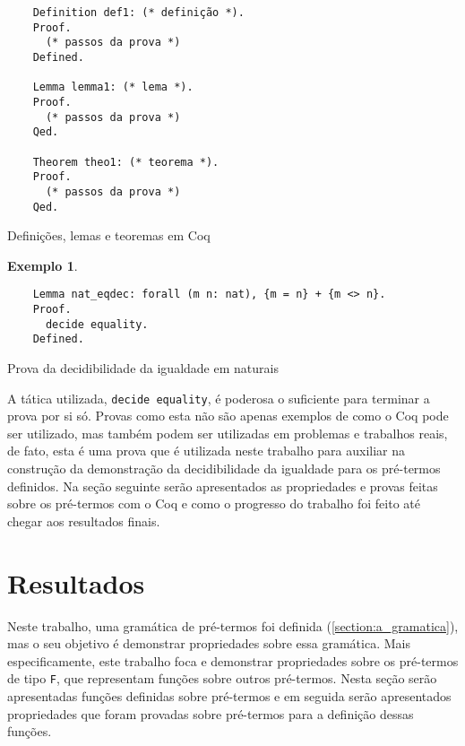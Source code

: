 \documentclass{article}
\newenvironment{codigo}{\captionsetup{type=listing}}{}
\newtheorem{exemplo}{Exemplo}
\begin{document}
\begin{codigo}
\begin{verbatim}
	Definition def1: (* definição *).
	Proof.
	  (* passos da prova *)
	Defined.

	Lemma lemma1: (* lema *).
	Proof.
	  (* passos da prova *)
	Qed.

	Theorem theo1: (* teorema *).
	Proof.
	  (* passos da prova *)
	Qed.
\end{verbatim}
\caption{Definições, lemas e teoremas em Coq}
\label{codigo:provas}
\end{codigo}

\begin{exemplo}
	\label{exemplo:decidibilidade_naturais}
\end{exemplo}
\begin{codigo}
\begin{verbatim}
	Lemma nat_eqdec: forall (m n: nat), {m = n} + {m <> n}.
	Proof.
	  decide equality.
	Defined.
\end{verbatim}
\caption{Prova da decidibilidade da igualdade em naturais}
\label{codigo:decidibilidade_naturais}
\end{codigo}

A tática utilizada, \texttt{decide equality}, é poderosa o suficiente para terminar a prova por si só.
Provas como esta não são apenas exemplos de como o Coq pode ser utilizado, mas também podem ser
utilizadas em problemas e trabalhos reais, de fato, esta é uma prova que é utilizada neste trabalho
para auxiliar na construção da demonstração da decidibilidade da igualdade para os pré-termos
definidos. Na seção seguinte serão apresentados as propriedades e provas feitas sobre os pré-termos com
o Coq e como o progresso do trabalho foi feito até chegar aos resultados finais.

\section{Resultados} %
\label{section:resultados}

Neste trabalho, uma gramática de pré-termos foi definida (\ref{section:a_gramatica}), mas o seu
objetivo é demonstrar propriedades sobre essa gramática. Mais especificamente, este trabalho foca e
demonstrar propriedades sobre os pré-termos de tipo \texttt{F}, que representam funções sobre outros
pré-termos. Nesta seção serão apresentadas funções definidas sobre pré-termos e em seguida serão
apresentados propriedades que foram provadas sobre pré-termos para a definição dessas funções.
\end{document}
